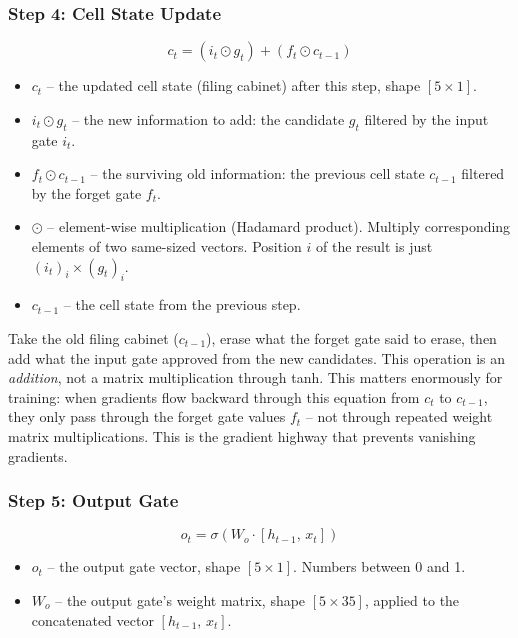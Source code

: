\subsubsection{Step 4: Cell State Update}

\[
c_t = (i_t \odot g_t) + (f_t \odot c_{t-1})
\]

\begin{itemize}
    \item $c_t$ -- the updated cell state (filing cabinet) after this step, shape
    $[5 \times 1]$.
    \item $i_t \odot g_t$ -- the new information to add: the candidate $g_t$ filtered
    by the input gate $i_t$.
    \item $f_t \odot c_{t-1}$ -- the surviving old information: the previous cell
    state $c_{t-1}$ filtered by the forget gate $f_t$.
    \item $\odot$ -- element-wise multiplication (Hadamard product). Multiply
    corresponding elements of two same-sized vectors. Position $i$ of the result
    is just $(i_t)_i \times (g_t)_i$.
    \item $c_{t-1}$ -- the cell state from the previous step.
\end{itemize}

Take the old filing cabinet ($c_{t-1}$), erase what the forget gate said to erase,
then add what the input gate approved from the new candidates. This operation is an
\textit{addition}, not a matrix multiplication through tanh. This matters enormously
for training: when gradients flow backward through this equation from $c_t$ to
$c_{t-1}$, they only pass through the forget gate values $f_t$ -- not through
repeated weight matrix multiplications. This is the gradient highway that prevents
vanishing gradients.

\subsubsection{Step 5: Output Gate}

\[
o_t = \sigma(W_o \cdot [h_{t-1},\, x_t])
\]

\begin{itemize}
    \item $o_t$ -- the output gate vector, shape $[5 \times 1]$. Numbers between
    0 and 1.
    \item $W_o$ -- the output gate's weight matrix, shape $[5 \times 35]$, applied to
    the concatenated vector $[h_{t-1},\, x_t]$.
\end{itemize}

